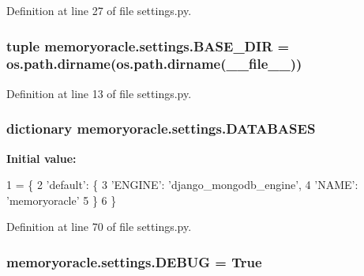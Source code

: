 Definition at line 27 of file settings.\+py.

\hypertarget{namespacememoryoracle_1_1settings_a863b63594639ca54681c195b58eb1b27}{}
\subsubsection[{B\+A\+S\+E\+\_\+\+D\+I\+R}]{\setlength{\rightskip}{0pt plus 5cm}tuple memoryoracle.\+settings.\+B\+A\+S\+E\+\_\+\+D\+I\+R = os.\+path.\+dirname(os.\+path.\+dirname(\+\_\+\+\_\+file\+\_\+\+\_\+))}\label{namespacememoryoracle_1_1settings_a863b63594639ca54681c195b58eb1b27}


Definition at line 13 of file settings.\+py.

\hypertarget{namespacememoryoracle_1_1settings_acb2be5a1881ee462bf8301b2e47754f4}{}
\subsubsection[{D\+A\+T\+A\+B\+A\+S\+E\+S}]{\setlength{\rightskip}{0pt plus 5cm}dictionary memoryoracle.\+settings.\+D\+A\+T\+A\+B\+A\+S\+E\+S}\label{namespacememoryoracle_1_1settings_acb2be5a1881ee462bf8301b2e47754f4}
{\bfseries Initial value\+:}
\begin{DoxyCode}
1 = \{
2     \textcolor{stringliteral}{'default'}: \{
3         \textcolor{stringliteral}{'ENGINE'}: \textcolor{stringliteral}{'django\_mongodb\_engine'},
4         \textcolor{stringliteral}{'NAME'}: \textcolor{stringliteral}{'memoryoracle'}
5     \}
6 \}
\end{DoxyCode}


Definition at line 70 of file settings.\+py.

\hypertarget{namespacememoryoracle_1_1settings_a27514ec5b2f50b45fc52ed1ce0bed93a}{}
\subsubsection[{D\+E\+B\+U\+G}]{\setlength{\rightskip}{0pt plus 5cm}memoryoracle.\+settings.\+D\+E\+B\+U\+G = True}\label{namespacememoryoracle_1_1settings_a27514ec5b2f50b45fc52ed1ce0bed93a}


